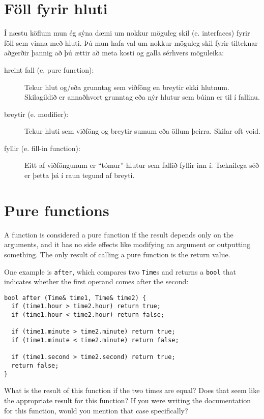 \section{Föll fyrir hluti}
\label{objectops}

Í næstu köflum mun ég sýna dæmi um nokkur möguleg skil (e. interfaces) fyrir föll sem vinna með hluti.
Þú mun hafa val um nokkur möguleg skil fyrir tilteknar aðgerðir þannig að þú ættir að meta kosti og galla sérhvers möguleika:

\begin{description}

\item[hreint fall (e. pure function):]  Tekur hlut og/eða grunntag sem viðföng en breytir ekki hlutnum.
Skilagildið er annaðhvort grunntag eða nýr hlutur sem búinn er til í fallinu. 

\item[breytir (e. modifier):]  Tekur hluti sem viðföng og breytir sumum eða öllum þeirra.  Skilar oft void. 

\item[fyllir (e. fill-in function):]  Eitt af viðföngunum er ``tómur'' hlutur sem fallið fyllir inn í.
Tæknilega séð er þetta þá í raun tegund af breyti. 

\end{description}

\section{Pure functions}

A function is considered a pure function if the result depends only on
the arguments, and it has no side effects like modifying an argument
or outputting something.  The only result of calling a pure function is
the return value.

One example is {\tt after}, which compares two {\tt Time}s and
returns a {\tt bool} that indicates whether the first operand
comes after the second:

\begin{verbatim}
bool after (Time& time1, Time& time2) {
  if (time1.hour > time2.hour) return true;
  if (time1.hour < time2.hour) return false;

  if (time1.minute > time2.minute) return true;
  if (time1.minute < time2.minute) return false;

  if (time1.second > time2.second) return true;
  return false;
}
\end{verbatim}
%
What is the result of this function if the two times are equal?  Does
that seem like the appropriate result for this function?  If you were
writing the documentation for this function, would you mention that case
specifically?

